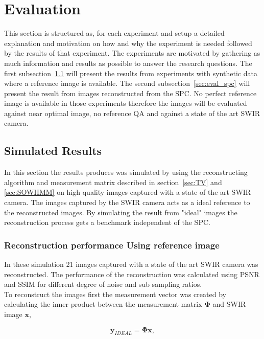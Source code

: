 \section{Evaluation}
\label{sec:Evaluation}
This section is structured as, for each experiment and setup a detailed explanation and motivation on how and why the experiment is needed followed by the results of that experiment. The experiments are motivated by gathering as much information and results as possible to answer the research questions. The first subsection~\ref{sec:simulated_results} will present the results from experiments with synthetic data where a reference image is available. The second subsection~\ref{sec:eval_spc} will present the result from images reconstructed from the SPC. No perfect reference image is available in those experiments therefore the images will be evaluated against near optimal image, no reference QA and against a state of the art SWIR camera. 



\subsection{Simulated Results}
\label{sec:simulated_results}
In this section the results produces was simulated by using the reconstructing algorithm and measurement matrix described in section~\ref{sec:TV} and \ref{sec:SOWHMM} on high quality images captured with a state of the art SWIR camera. The images captured by the SWIR camera acts as a ideal reference to the reconstructed images. By simulating the result from "ideal" images the reconstruction process gets a benchmark independent of the SPC.


\subsubsection{Reconstruction performance Using reference image}
\label{sec:reconstruction_performance}
In these simulation 21 images captured with a state of the art SWIR camera was reconstructed. The performance of the reconstruction was calculated using PSNR and SSIM for different degree of noise and sub sampling ratios.\\[0.1in]

To reconstruct the images first the measurement vector was created by calculating the inner product between the measurement matrix ${\mathbf{\Phi}}$ and SWIR image $\mathbf{x}$,

\begin{equation}
\mathbf{y}_{IDEAL} = \mathbf{\Phi}\mathbf{x},
\end{equation}  

